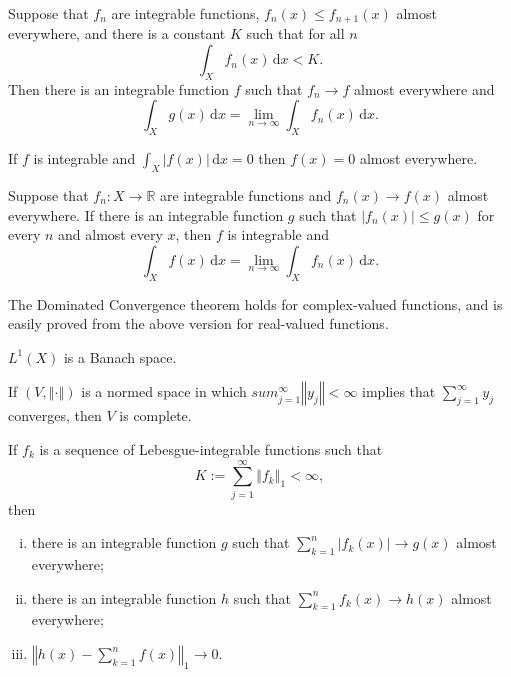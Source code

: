 \documentclass[a4paper]{article}
\newcommand{\R}{\mathbb{R}}
\newcommand{\integ}[4]{\int_{#1}^{#2}\!{#3}\,\mathrm{d}{#4}}
\newcommand{\norm}[1]{\left\Vert #1 \right\Vert}
\newcommand{\<}{\langle}
\renewcommand{\>}{\rangle}
\begin{document}
\begin{thm}
  Suppose that $f_n$ are integrable functions, $f_n(x)\leq f_{n+1}(x)$ almost everywhere, and there is a constant $K$ such that for all $n$
  $$\integ{X}{}{f_n(x)}{x}<K.$$
  Then there is an integrable function $f$ such that $f_n\to f$ almost everywhere and
  $$\integ{X}{}{g(x)}{x} = \lim_{n\to\infty}\integ{X}{}{f_n(x)}{x}.$$
\end{thm}

\begin{prop}
  If $f$ is integrable and $\integ{X}{}{|f(x)|}{x}=0$ then $f(x)=0$ almost everywhere.
\end{prop}

\begin{thm}
  Suppose that $f_n:X\to\R$ are integrable functions and $f_n(x)\to f(x)$ almost everywhere. If there is an integrable function $g$ such that $|f_n(x)|\leq g(x)$ for every $n$ and almost every $x$, then $f$ is integrable and
  $$\integ{X}{}{f(x)}{x} = \lim_{n\to\infty}\integ{X}{}{f_n(x)}{x}.$$
\end{thm}

The Dominated Convergence theorem holds for complex-valued functions, and is easily proved from the above version for real-valued functions.

\begin{thm}
  $L^1(X)$ is a Banach space.
\end{thm}

\begin{lemma}
  If $(V,\norm{\cdot})$ is a normed space in which $sum_{j=1}^\infty\norm{y_j}<\infty$ implies that $\sum_{j=1}^\infty y_j$ converges, then $V$ is complete.
\end{lemma}

\begin{lemma}
  If $f_k$ is a sequence of Lebesgue-integrable functions such that
  $$ K := \sum_{j=1}^\infty\norm{f_k}_1<\infty,$$
  then
  \begin{enumerate}[(i)]
    \item there is an integrable function $g$ such that $\sum_{k=1}^n |f_k(x)| \to g(x)$ almost everywhere;
    \item there is an integrable function $h$ such that $\sum_{k=1}^n f_k(x) \to h(x)$ almost everywhere;
    \item $\norm{h(x)-\sum_{k=1}^n f(x)}_1\to0$.
  \end{enumerate}
\end{lemma}
\end{document}

